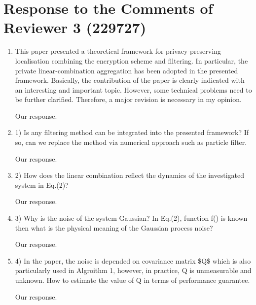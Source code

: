 \documentclass[a4paper]{scrartcl}
\newenvironment{rebuttal}{\begin{enumerate}[label={\color{grey}\thesection.\arabic{enumi}},leftmargin=0pt,ref=\thesection.\arabic{enumi}]}{\end{enumerate}}
\newcommand{\reviewtext}[1]{{\color{nblue} #1}}
\begin{document}



\section*{Response to the Comments of Reviewer 3 (229727)}
\def\thesection{R3}
\begin{rebuttal}
\item \reviewtext{This paper presented a theoretical framework for privacy-preserving localisation combining the encryption scheme and filtering. In particular, the private linear-combination aggregation has been adopted in the presented framework. Basically, the contribution of the paper is clearly indicated with an interesting and important topic. However, some technical problems need to be further clarified. Therefore, a major revision is necessary in my opinion.}

Our response.

\item \reviewtext{1) Is any filtering method can be integrated into the presented framework? If so, can we replace the method via numerical approach such as particle filter.}

Our response.

\item \reviewtext{2) How does the linear combination reflect the dynamics of the investigated system in Eq.(2)?}

Our response.

\item \reviewtext{3) Why is the noise of the system Gaussian? In Eq.(2), function f() is known then what is the physical meaning of the Gaussian process noise?}

Our response.

\item \reviewtext{4) In the paper, the noise is depended on covariance matrix \$Q\$ which is also particularly used in Algroithm 1, however, in practice, Q is unmeasurable and unknown. How to estimate the value of Q in terms of performance guarantee.}

Our response.


\end{rebuttal}
\end{document}
